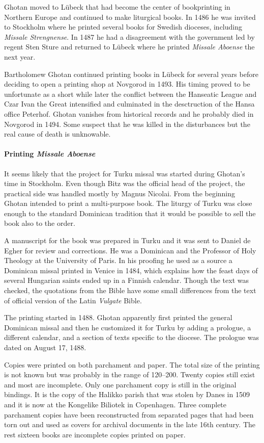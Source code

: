 \documentclass[a4paper, 12pt]{article}
\begin{document}
Ghotan moved to Lübeck that had become the center of bookprinting in
Northern Europe and continued to make liturgical books. In 1486 he was
invited to Stockholm where he printed several books for Swedish
dioceses, including \emph{Missale Strengnense}. In 1487 he had a
disagreement with the government led by regent Sten Sture and returned
to Lübeck where he printed \emph{Missale Aboense} the next year.

Bartholomew Ghotan continued printing books in Lübeck for several
years before deciding to open a printing shop at Novgorod in 1493. His
timing proved to be unfortunate as a short while later the conflict
between the Hanseatic League and Czar Ivan the Great intensified and
culminated in the desctruction of the Hansa office Peterhof. Ghotan
vanishes from historical records and he probably died in Novgorod in
1494. Some suspect that he was killed in the disturbances but the real
cause of death is unknowable.

\paragraph{Printing \emph{Missale Aboense}}

It seems likely that the project for Turku missal was started during
Ghotan's time in Stockholm. Even though Bitz was the official head of
the project, the practical side was handled mostly by Magnus Nicolai.
From the beginning Ghotan intended to print a multi-purpose book. The
liturgy of Turku was close enough to the standard Dominican tradition
that it would be possible to sell the book also to the order.

A manuscript for the book was prepared in Turku and it was sent to
Daniel de Egher for review and corrections. He was a Dominican and the
Professor of Holy Theology at the University of Paris. In his proofing
he used as a source a Dominican missal printed in Venice in 1484,
which explains how the feast days of several Hungarian saints ended up
in a Finnish calendar. Though the text was checked, the quotations
from the Bible have some small differences from the text of official
version of the Latin \emph{Vulgate} Bible.

The printing started in 1488. Ghotan apparently first printed the
general Dominican missal and then he customized it for Turku by adding
a prologue, a different calendar, and a section of texts specific to
the diocese. The prologue was dated on August 17, 1488.

Copies were printed on both parchament and paper. The total size of
the printing is not known but was probably in the range of 120–200.
Twenty copies still exist and most are incomplete. Only one parchament
copy is still in the original bindings. It is the copy of the Halikko
parish that was stolen by Danes in 1509 and it is now at the Kongelike
Biliotek in Copenhagen. Three complete parchament copies have been
reconstructed from separated pages that had been torn out and used as
covers for archival documents in the late 16th century. The rest
sixteen books are incomplete copies printed on paper.
\end{document}
